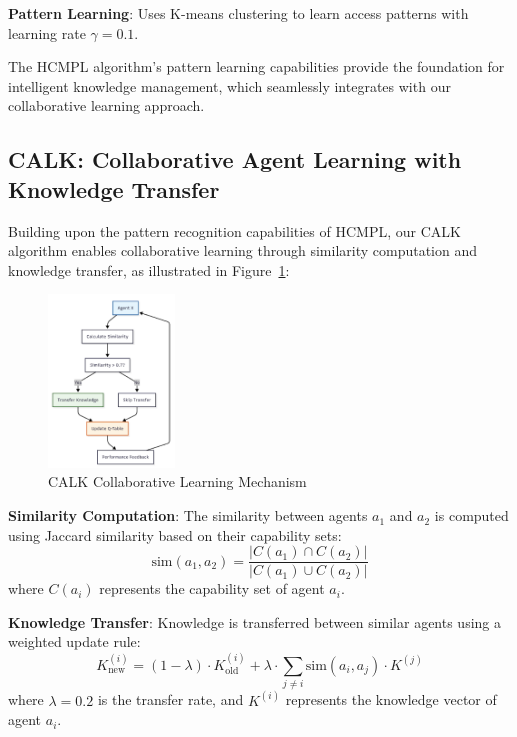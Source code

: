 \documentclass[conference]{IEEEtran}
\begin{document}
\textbf{Pattern Learning}: Uses K-means clustering to learn access patterns with learning rate $\gamma = 0.1$.

The HCMPL algorithm's pattern learning capabilities provide the foundation for intelligent knowledge management, which seamlessly integrates with our collaborative learning approach.

\subsection{CALK: Collaborative Agent Learning with Knowledge Transfer}

Building upon the pattern recognition capabilities of HCMPL, our CALK algorithm enables collaborative learning through similarity computation and knowledge transfer, as illustrated in Figure~\ref{fig:calk}:

\begin{figure}[htbp]
\centering
\includegraphics[width=0.3\textwidth]{figures/images/crl_learning_mechanism.png}
\caption{CALK Collaborative Learning Mechanism}
\label{fig:calk}
\end{figure}

\textbf{Similarity Computation}: The similarity between agents $a_1$ and $a_2$ is computed using Jaccard similarity based on their capability sets:
\begin{equation}
\text{sim}(a_1, a_2) = \frac{|C(a_1) \cap C(a_2)|}{|C(a_1) \cup C(a_2)|}
\end{equation}
where $C(a_i)$ represents the capability set of agent $a_i$.

\textbf{Knowledge Transfer}: Knowledge is transferred between similar agents using a weighted update rule:
\begin{equation}
K_{\text{new}}^{(i)} = (1-\lambda) \cdot K_{\text{old}}^{(i)} + \lambda \cdot \sum_{j \neq i} \text{sim}(a_i, a_j) \cdot K^{(j)}
\end{equation}
where $\lambda = 0.2$ is the transfer rate, and $K^{(i)}$ represents the knowledge vector of agent $a_i$.
\end{document}
